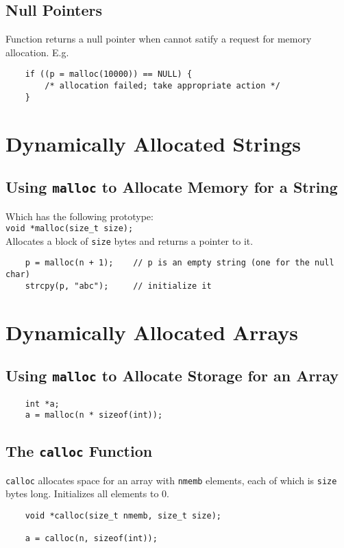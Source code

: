 \documentclass[openany]{book}
\begin{document}
    \subsection*{Null Pointers}
    Function returns a null pointer when cannot satify a request for memory allocation. E.g.
    \begin{lstlisting}
    if ((p = malloc(10000)) == NULL) {
        /* allocation failed; take appropriate action */
    }
    \end{lstlisting}

    \section{Dynamically Allocated Strings}

    \subsection*{Using \texttt{malloc} to Allocate Memory for a String}
    Which has the following prototype: \\
    \texttt{void *malloc(size\_t size);} \\
    Allocates a block of \texttt{size} bytes and returns a pointer to it.

    \bigskip

    \begin{lstlisting}
    p = malloc(n + 1);    // p is an empty string (one for the null char)
    strcpy(p, "abc");     // initialize it
    \end{lstlisting}

    \section{Dynamically Allocated Arrays}

    \subsection*{Using \texttt{malloc} to Allocate Storage for an Array}

    \begin{lstlisting}
    int *a;
    a = malloc(n * sizeof(int));
    \end{lstlisting}

    \subsection*{The \texttt{calloc} Function}
    \texttt{calloc} allocates space for an array with \texttt{nmemb} elements, each of which is \texttt{size} bytes long. Initializes all elements to 0.
    \begin{lstlisting}
    void *calloc(size_t nmemb, size_t size);

    a = calloc(n, sizeof(int));
    \end{lstlisting}
\end{document}
